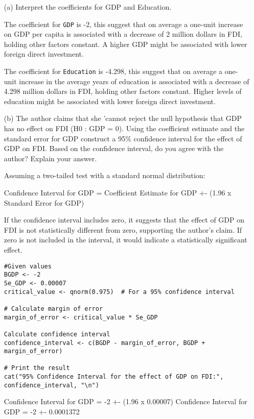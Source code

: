 \documentclass[12pt,letterpaper]{article}
\begin{document}
\begin{enumerate}
	\item [(a)] Interpret the coefficients for GDP and Education.
	\vspace{.25cm}

	The coefficient for \texttt{GDP} is -2, this suggest that on average a one-unit increase on GDP per capita is associated with a decrease of 2 million dollars in FDI, holding other factors constant. A higher GDP might be associated with lower foreign direct investment. 
	\vspace{.25cm}

	The coefficient for \texttt{Education} is -4.298, this suggest that on average a one-unit increase in the average years of education is associated with a decrease of 4.298 million dollars in FDI, holding other factors constant. Higher levels of education might be associated with lower foreign direct investment. 

\newpage

	\item [(b)] The author claims that she ’cannot reject the null hypothesis that GDP has no effect
	on FDI (H0 : GDP = 0). Using the coefficient estimate and the standard error for GDP construct a 95\% confidence interval for the effect of GDP on FDI. Based on the confidence interval, do you agree with the author? Explain your answer.

\vspace{1cm}	
	Assuming a two-tailed test with a standard normal distribution:

	Confidence Interval for GDP = Coefficient Estimate for GDP +- (1.96 x Standard Error for GDP)
	
	If the confidence interval includes zero, it suggests that the effect of GDP on FDI is not statistically different from zero, supporting the author's claim. If zero is not included in the interval, it would indicate a statistically significant effect.
\vspace{.5cm}		
	\begin{lstlisting}
#Given values
BGDP <- -2
Se_GDP <- 0.00007
critical_value <- qnorm(0.975)  # For a 95% confidence interval

# Calculate margin of error
margin_of_error <- critical_value * Se_GDP

Calculate confidence interval
confidence_interval <- c(BGDP - margin_of_error, BGDP + margin_of_error)

# Print the result
cat("95% Confidence Interval for the effect of GDP on FDI:", confidence_interval, "\n")
	\end{lstlisting}
\vspace{.5cm}		
	Confidence Interval for GDP = -2 +- (1.96 x 0.00007)
	Confidence Interval for GDP = -2 +- 0.0001372
	

\end{enumerate}
\end{document}
